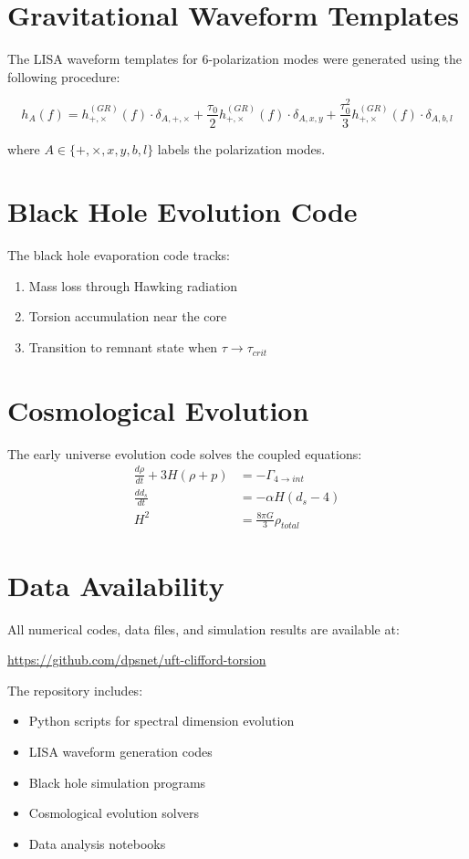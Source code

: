 \section{Gravitational Waveform Templates}

The LISA waveform templates for 6-polarization modes were generated using the following procedure:

\begin{equation}
    h_A(f) = h_{+,\times}^{(GR)}(f) \cdot \delta_{A,+,\times} + \frac{\tau_0}{2} h_{+,\times}^{(GR)}(f) \cdot \delta_{A,x,y} + \frac{\tau_0^2}{3} h_{+,\times}^{(GR)}(f) \cdot \delta_{A,b,l}
\end{equation}

where $A \in \{+, \times, x, y, b, l\}$ labels the polarization modes.

\section{Black Hole Evolution Code}

The black hole evaporation code tracks:
\begin{enumerate}
    \item Mass loss through Hawking radiation
    \item Torsion accumulation near the core
    \item Transition to remnant state when $\tau \to \tau_{crit}$
\end{enumerate}

\section{Cosmological Evolution}

The early universe evolution code solves the coupled equations:
\begin{align}
    \frac{d\rho}{dt} + 3H(\rho + p) &= -\Gamma_{4 \to int} \\
    \frac{dd_s}{dt} &= -\alpha H (d_s - 4) \\
    H^2 &= \frac{8\pi G}{3}\rho_{total}
\end{align}

\section{Data Availability}

All numerical codes, data files, and simulation results are available at:
\begin{center}
\url{https://github.com/dpsnet/uft-clifford-torsion}
\end{center}

The repository includes:
\begin{itemize}
    \item Python scripts for spectral dimension evolution
    \item LISA waveform generation codes
    \item Black hole simulation programs
    \item Cosmological evolution solvers
    \item Data analysis notebooks
\end{itemize}
